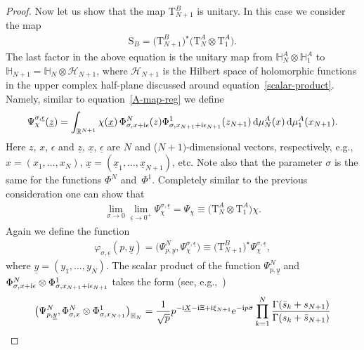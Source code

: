 \documentclass[pdftex]{sigma}%
\numberwithin{equation}{section}
\begin{document}
\begin{proof}
Now let us show that the map $\mathrm T_{N+1}^B$ is unitary. In this case we consider the map
\begin{gather*}
\mathrm S_{B}=\big(\mathrm T_{N+1}^{B}\big)^{\star}\big(\mathrm T_{N}^A\otimes \mathrm T_1^A\big).
\end{gather*}
The last factor in the above equation is the unitary map from $\mathbb H_N^A\otimes \mathbb H_1^A$ to $\mathbb H_{N+1}=\mathbb
H_N\otimes\mathcal H_{N+1}$, where $\mathcal H_{N+1}$ is the Hilbert space of holomorphic functions in the upper complex half-plane
discussed around equation~\eqref{scalar-product}. Namely, similar to equation~\eqref{A-map-reg} we define
\begin{gather*}
\Psi^{\sigma,\underline{\epsilon}}_{\chi}(\underline{z})
=\int_{\mathbb R^{N+1}} \chi(\underline{x})\, \Phi^N_{{\sigma,x+{\rm i}\epsilon}}(z)\Phi^1_{{\sigma,x_{N+1}+{\rm i}\epsilon_{N+1}}}(z_{N+1})
\, {\rm d}\mu_{N}^{A}( x)\, {\rm d}\mu_1^A(x_{N+1}).
\end{gather*}
Here $z$, $x$, $\epsilon$ and $\underline z$, $\underline x$, $\underline \epsilon$ are $N$ and ($N+1)$-dimensional vectors, respectively, e.g.,
$x=(x_1,\dots,x_N)$, $\underline x=(\underline x_1,\dots,\underline x_{N+1})$, etc. Note also that the parameter $\sigma$ is the
same for the functions $\Phi^N$ and~$\Phi^1$. Completely similar to the previous consideration one can show that
\begin{gather*}
\lim_{\sigma\to0} \lim_{\underline{\epsilon}\to 0^+} \Psi^{\sigma,\underline{\epsilon}}_{\chi}
 =\Psi_{\chi} \equiv \big(\mathrm T_{N}^A\otimes \mathrm T_1^A\big)\chi.
\end{gather*}
Again we define the function
\begin{gather*}
\varphi_{\sigma,\underline \epsilon}(p,\underline y)
=\big(\Psi^N_{p,\underline y},\Psi^{\sigma,\underline\epsilon}_\chi\big)
\equiv \big(\mathrm T_{N+1}^{B}\big)^{\star} \Psi^{\sigma,\underline{\epsilon}}_{\chi},
\end{gather*}
where $\underline y =(y_1,\dots,y_N)$. The scalar product of the function $\Psi^N_{p,\underline y}$ and $\Phi^N_{{\sigma,x+{\rm i}\epsilon}}\otimes\Phi^1_{\sigma,x_{N+1}+{\rm i}\epsilon_{N+1}}$ takes the form (see, e.g.,~\cite{DMspinchainandSL2RGustafson})
\begin{gather*}
\big(\Psi^N_{p,\underline y},\Phi^N_{{\sigma,x}}\otimes\Phi^1_{\sigma,x_{N+1}}\big)_{\mathbb H_N} =
\frac1{\sqrt{p}} p^{-{\rm i}\underline X-{\rm i}\Xi +{\rm i}\xi_{N+1}} {\rm e}^{-{\rm i}p\bar\sigma}
\prod_{k=1}^N \frac{\Gamma(\bar s_k+s_{N+1})}{\Gamma(s_k+\bar s_{N+1})}

\end{gather*}
\end{proof}
\end{document}
